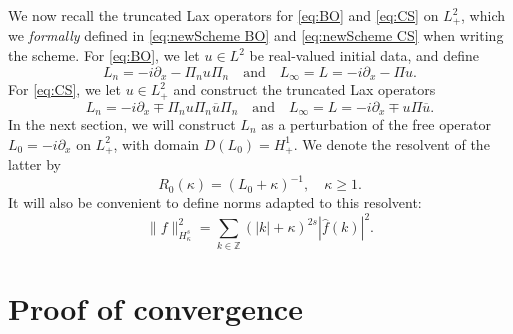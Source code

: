 \documentclass [11pt] {article}
\newcommand{\<}{\langle}
\renewcommand{\>}{\rangle}
\newcommand{\wh}[1]{\widehat{#1}}
\newcommand{\ol}[1]{\overline{#1}}
\newcommand\Z{\mathbb{Z}}
\begin{document}
We now recall the truncated Lax operators for \eqref{eq:BO} and \eqref{eq:CS} on $L^2_+$, which we {\it formally} defined in \eqref{eq:newScheme BO} and \eqref{eq:newScheme CS} when writing the scheme.
For \eqref{eq:BO}, we let $u\in L^2$ be real-valued initial data,  and define
\begin{equation}\label{eq:BO-trunc}
L_n = -i\partial_x - \Pi_n u \Pi_n \quad\text{and}\quad L_\infty = L = -i\partial_x - \Pi u .
\end{equation}
For \eqref{eq:CS}, we let $u\in L^2_+$ and construct the truncated Lax operators
\begin{equation}\label{eq:CS-trunc}
L_n = -i\partial_x \mp \Pi_n u \Pi_n\ol{u} \Pi_n \quad\text{and}\quad L_\infty = L = -i\partial_x \mp u\Pi \ol{u} .
\end{equation}
%
In the next section, we will construct $L_n$ as a perturbation of the free operator $L_0 = -i\partial_x$ on $L^2_+$, with domain $D(L_0) = H^1_{+}$.  We denote the resolvent of the latter by
\begin{equation*}
R_0(\kappa) = (L_0 + \kappa)^{-1}, \quad \kappa \ge 1.
\end{equation*}
It will also be convenient to define norms adapted to this resolvent:
\begin{equation}\label{eq:Hskappa}
\|f\|_{H^s_\kappa}^2 = \sum_{k\in\Z} (|k|+\kappa)^{2s} |\wh{f}(k)|^2.
\end{equation}









 















\section{Proof of convergence}\label{sec:pf}
\end{document}
